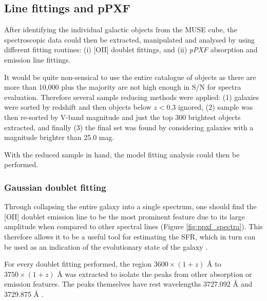 \documentclass[12pt, twocolumn]{revtex4-1}    %
\begin{document}
\subsection{Line fittings and pPXF} 

After identifying the individual galactic objects from the MUSE cube, the spectroscopic data could then be extracted, manipulated and analysed by using different fitting routines: (i) [OII] doublet fittings, and (ii) \textit{pPXF} absorption and emission line fittings.


It would be quite non-sensical to use the entire catalogue of objects as there are more than 10,000 plus the majority are not high enough in S/N for spectra evaluation. Therefore several sample reducing methods were applied: (1) galaxies were sorted by redshift and then objects below $z<0.3$ ignored, (2) sample was then re-sorted by V-band magnitude and just the top 300 brightest objects extracted, and finally (3) the final set was found by considering galaxies with a magnitude brighter than 25.0 mag. 

With the reduced sample in hand, the model fitting analysis could then be performed.





\subsubsection{Gaussian doublet fitting}

Through collapsing the entire galaxy into a single spectrum, one should find the [OII] doublet emission line to be the most prominent feature due to its large amplitude when compared to other spectral lines (Figure \ref{fig:ppxf_spectra}). This therefore allows it to be a useful tool for estimating the SFR, which in turn can be used as an indication of the evolutionary state of the galaxy \citep{maddox_oxygen}.

For every doublet fitting performed, the region $3600\times(1+z)$ {\AA} to $3750\times(1+z)$ {\AA} was extracted to isolate the peaks from other absorption or emission features. The peaks themselves have rest wavelengths 3727.092 {\AA} and 3729.875 {\AA} \citep{sdss_lines}. 
\end{document}
